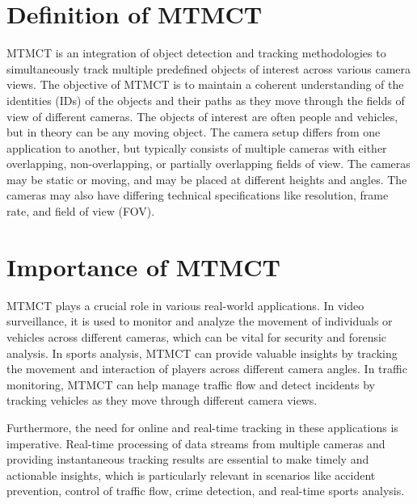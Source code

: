 \section{Definition of MTMCT}\label{sec:definition_of_mtmct}
MTMCT is an integration of object detection and tracking methodologies to simultaneously track multiple predefined objects of interest across various camera views. The objective of MTMCT is to maintain a coherent understanding of the identities (IDs) of the objects and their paths as they move through the fields of view of different cameras. The objects of interest are often people and vehicles, but in theory can be any moving object. The camera setup differs from one application to another, but typically consists of multiple cameras with either overlapping, non-overlapping, or partially overlapping fields of view. The cameras may be static or moving, and may be placed at different heights and angles. The cameras may also have differing technical specifications like resolution, frame rate, and field of view (FOV).

\section{Importance of MTMCT}\label{sec:importance_of_mtmct}
MTMCT plays a crucial role in various real-world applications. In video surveillance, it is used to monitor and analyze the movement of individuals or vehicles across different cameras, which can be vital for security and forensic analysis. In sports analysis, MTMCT can provide valuable insights by tracking the movement and interaction of players across different camera angles. In traffic monitoring, MTMCT can help manage traffic flow and detect incidents by tracking vehicles as they move through different camera views.

Furthermore, the need for online and real-time tracking in these applications is imperative. Real-time processing of data streams from multiple cameras and providing instantaneous tracking results are essential to make timely and actionable insights, which is particularly relevant in scenarios like accident prevention, control of traffic flow, crime detection, and real-time sports analysis.

